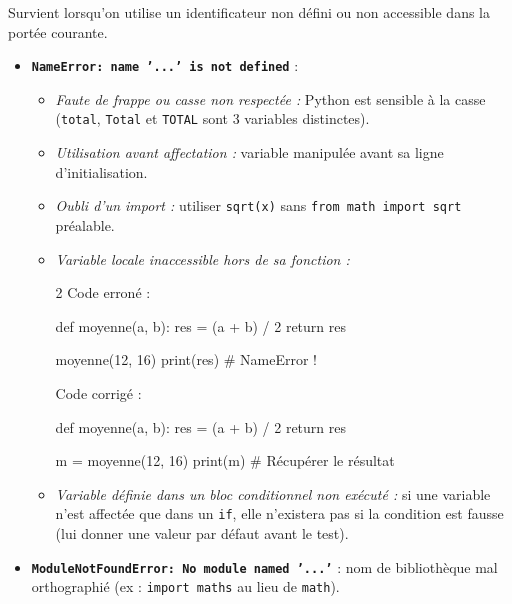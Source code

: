 \documentclass[11pt,a4paper]{article}
\begin{document}
\begin{tcolorbox}[left=0cm,title=\bf{\faBug \; 5. Erreurs de nom et portée (NameError, UnboundLocalError)},colbacktitle=cfond]
Survient lorsqu'on utilise un identificateur non défini ou non accessible dans la portée courante.
\begin{itemize}
	\item[\textbullet] \textbf{\texttt{NameError: name '...' is not defined}} :
	\begin{itemize}
		\item \textit{Faute de frappe ou casse non respectée :} Python est sensible à la casse (\texttt{total}, \texttt{Total} et \texttt{TOTAL} sont 3 variables distinctes).
		\item \textit{Utilisation avant affectation :} variable manipulée avant sa ligne d'initialisation.
		\item \textit{Oubli d'un import :} utiliser \texttt{sqrt(x)} sans \texttt{from math import sqrt} préalable.
		\item \textit{Variable locale inaccessible hors de sa fonction :}
		\setlength{\multicolsep}{0pt}
		\begin{multicols}{2}
			\textcolor{BrickRed}{\faTimesCircle \; Code erroné :}
			\begin{python}
def moyenne(a, b):
    res = (a + b) / 2
    return res

moyenne(12, 16)
print(res) # NameError !
			\end{python}
			\textcolor{OliveGreen}{\faCheckCircle \; Code corrigé :}
			\begin{python}
def moyenne(a, b):
    res = (a + b) / 2
    return res

m = moyenne(12, 16)
print(m) # Récupérer le résultat
			\end{python}
		\end{multicols}
		\item \textit{Variable définie dans un bloc conditionnel non exécuté :} si une variable n'est affectée que dans un \texttt{if}, elle n'existera pas si la condition est fausse (lui donner une valeur par défaut avant le test).
	\end{itemize}

	\item[\textbullet] \textbf{\texttt{ModuleNotFoundError: No module named '...'}} : nom de bibliothèque mal orthographié (ex : \texttt{import maths} au lieu de \texttt{math}).
\end{itemize}
\end{tcolorbox}
\end{document}
